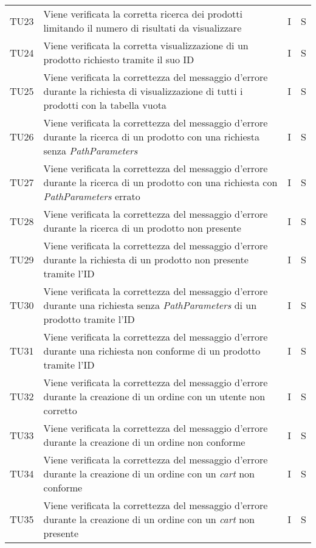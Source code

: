 {\begin{longtable}{C{2cm} C{9.6cm} C{1.5cm} C{1cm}}
TU23 & Viene verificata la corretta ricerca dei prodotti limitando il numero di risultati da visualizzare & I & S\\

TU24 & Viene verificata la corretta visualizzazione di un prodotto richiesto tramite il suo ID & I & S\\

TU25 & Viene verificata la correttezza del messaggio d'errore durante la richiesta di visualizzazione di tutti i prodotti con la tabella vuota & I & S\\

TU26 & Viene verificata la correttezza del messaggio d'errore durante la ricerca di un prodotto con una richiesta senza \textit{PathParameters} & I & S\\

TU27 & Viene verificata la correttezza del messaggio d'errore durante la ricerca di un prodotto con una richiesta con \textit{PathParameters} errato & I & S\\

TU28 & Viene verificata la correttezza del messaggio d'errore durante la ricerca di un prodotto non presente & I & S\\

TU29 & Viene verificata la correttezza del messaggio d'errore durante la richiesta di un prodotto non presente tramite l'ID & I & S\\

TU30 & Viene verificata la correttezza del messaggio d'errore durante una richiesta senza \textit{PathParameters} di un prodotto tramite l'ID & I & S\\

TU31 & Viene verificata la correttezza del messaggio d'errore durante una richiesta non conforme di un prodotto tramite l'ID & I & S\\

TU32 & Viene verificata la correttezza del messaggio d'errore durante la creazione di un ordine con un utente non corretto & I & S\\

TU33 & Viene verificata la correttezza del messaggio d'errore durante la creazione di un ordine non conforme & I & S\\

TU34 & Viene verificata la correttezza del messaggio d'errore durante la creazione di un ordine con un \textit{cart} non conforme & I & S\\

TU35 & Viene verificata la correttezza del messaggio d'errore durante la creazione di un ordine con un \textit{cart} non presente & I & S\\


\end{longtable}}
